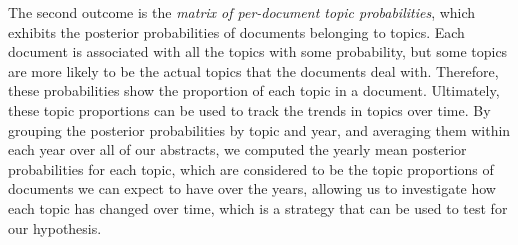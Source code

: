 The second outcome is the \textit{matrix of per-document topic probabilities}, which exhibits the posterior probabilities of documents belonging to topics. Each document is associated with all the topics with some probability, but some topics are more likely to be the actual topics that the documents deal with. Therefore, these probabilities show the proportion of each topic in a document. Ultimately, these topic proportions can be used to track the trends in topics over time. By grouping the posterior probabilities by topic and year, and averaging them within each year over all of our abstracts, we computed the yearly mean posterior probabilities for each topic, which are considered to be the topic proportions of documents we can expect to have over the years, allowing us to investigate how each topic has changed over time, which is a strategy that can be used to test for our hypothesis.
